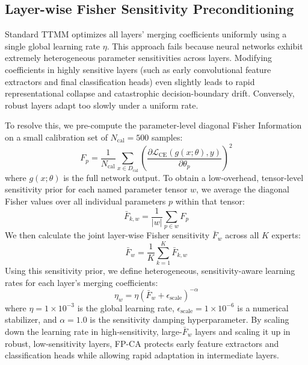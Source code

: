 \documentclass{article}
\theoremstyle{plain}
\theoremstyle{definition}
\theoremstyle{remark}
\begin{document}
\subsection{Layer-wise Fisher Sensitivity Preconditioning}
Standard TTMM optimizes all layers' merging coefficients uniformly using a single global learning rate $\eta$. This approach fails because neural networks exhibit extremely heterogeneous parameter sensitivities across layers. Modifying coefficients in highly sensitive layers (such as early convolutional feature extractors and final classification heads) even slightly leads to rapid representational collapse and catastrophic decision-boundary drift. Conversely, robust layers adapt too slowly under a uniform rate.

To resolve this, we pre-compute the parameter-level diagonal Fisher Information on a small calibration set of $N_{\text{cal}} = 500$ samples:
\begin{equation}
  F_p = \frac{1}{N_{\text{cal}}} \sum_{x \in D_{\text{cal}}} \left( \frac{\partial \mathcal{L}_{\text{CE}}(g(x; \theta), y)}{\partial \theta_p} \right)^2
\end{equation}
where $g(x; \theta)$ is the full network output. To obtain a low-overhead, tensor-level sensitivity prior for each named parameter tensor $w$, we average the diagonal Fisher values over all individual parameters $p$ within that tensor:
\begin{equation}
  \bar{F}_{k,w} = \frac{1}{|w|} \sum_{p \in w} F_p
\end{equation}
We then calculate the joint layer-wise Fisher sensitivity $\bar{F}_w$ across all $K$ experts:
\begin{equation}
  \bar{F}_w = \frac{1}{K} \sum_{k=1}^K \bar{F}_{k,w}
\end{equation}
Using this sensitivity prior, we define heterogeneous, sensitivity-aware learning rates for each layer's merging coefficients:
\begin{equation}
  \eta_w = \eta (\bar{F}_w + \epsilon_{\text{scale}})^{-\alpha}
\end{equation}
where $\eta = 1\times 10^{-3}$ is the global learning rate, $\epsilon_{\text{scale}} = 1\times 10^{-6}$ is a numerical stabilizer, and $\alpha = 1.0$ is the sensitivity damping hyperparameter. By scaling down the learning rate in high-sensitivity, large-$\bar{F}_w$ layers and scaling it up in robust, low-sensitivity layers, FP-CA protects early feature extractors and classification heads while allowing rapid adaptation in intermediate layers.
\end{document}
